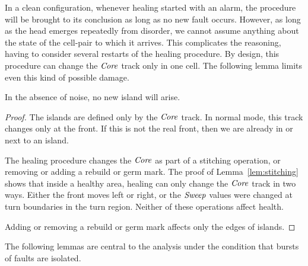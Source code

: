 \documentclass[11pt]{memoir}
\theoremstyle{definition} %
\newcommand{\fld}[1]{\ensuremath{\textit{#1\/}}}
\newcommand{\Core}{\fld{Core}}
\newcommand{\Sweep}{\fld{Sweep}} %
\begin{document}
In a clean configuration, whenever healing started with an alarm, the procedure
will be brought to its conclusion as long as no new fault occurs.
However, as long as the head emerges repeatedly from disorder, we
cannot assume anything about the state of the cell-pair to which it arrives.
This complicates the reasoning, having to consider several restarts of the healing procedure.
By design, this procedure can change the \( \Core \) track only in one cell.
The following lemma limits even this kind of possible damage.

\begin{lemma}
In the absence of noise, no new island will arise.
\end{lemma}
\begin{proof}
  The islands are defined only by the \( \Core \) track.  
In normal mode, this track changes only at the front.
If this is not the real front, then we are already in or next to an island.

The healing procedure changes the \( \Core \) as part of a stitching operation,
or removing or adding a rebuild or germ mark.
The proof of Lemma~\ref{lem:stitching} shows that 
inside a healthy area, healing can only change the \( \Core \) track in two ways.
Either the front moves left or right, or the \( \Sweep \) values were changed
at turn boundaries in the turn region.
Neither of these operations affect health.

Adding or removing a rebuild or germ mark affects only the edges of islands.
\end{proof}

The following lemmas are central to the analysis under the condition that bursts of faults are isolated.
\end{document}
